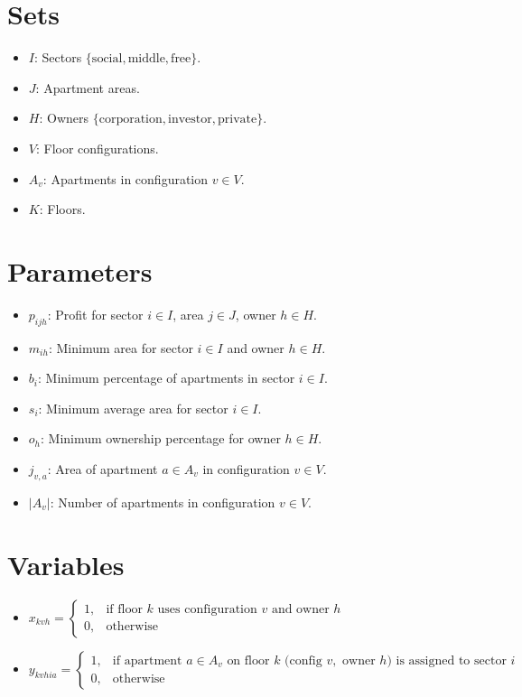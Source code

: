 \documentclass{article}
\begin{document}
\section{Sets}
\begin{itemize}[leftmargin=*,nosep]
    \item $I$: Sectors $\{\text{social}, \text{middle}, \text{free}\}$.
    \item $J$: Apartment areas.
    \item $H$: Owners $\{\text{corporation}, \text{investor}, \text{private}\}$.
    \item $V$: Floor configurations.
    \item $A_v$: Apartments in configuration $v \in V$.
    \item $K$: Floors.
\end{itemize}

\section{Parameters}
\begin{itemize}[leftmargin=*,nosep]
    \item $p_{ijh}$: Profit for sector $i \in I$, area $j \in J$, owner $h \in H$.
    \item $m_{ih}$: Minimum area for sector $i \in I$ and owner $h \in H$.
    \item $b_i$: Minimum percentage of apartments in sector $i \in I$.
    \item $s_i$: Minimum average area for sector $i \in I$.
    \item $o_h$: Minimum ownership percentage for owner $h \in H$.
    \item $j_{v,a}$: Area of apartment $a \in A_v$ in configuration $v \in V$.
    \item $|A_v|$: Number of apartments in configuration $v \in V$.
\end{itemize}

\section{Variables}
\begin{itemize}[leftmargin=*,nosep]
    \item $x_{kvh} = \begin{cases} 
        1, & \text{if floor } k \text{ uses configuration } v \text{ and owner } h \\ 
        0, & \text{otherwise} 
    \end{cases}$
    \item $y_{kvhia} = \begin{cases} 
        1, & \text{if apartment } a \in A_v \text{ on floor } k \text{ (config } v, \text{ owner } h) \text{ is assigned to sector } i \\ 
        0, & \text{otherwise} 
    \end{cases}$
\end{itemize}
\end{document}
